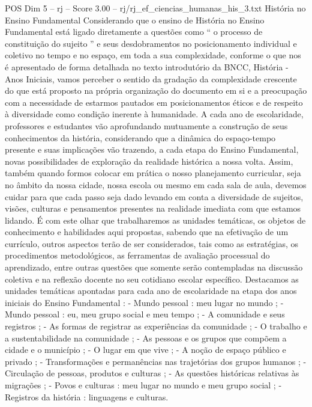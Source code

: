\begin{textsample}{POS Dim 5 – rj – Score 3.00 – rj/rj\_ef\_ciencias\_humanas\_his\_3.txt}  \label{ex:f5_pos_199}
História no Ensino Fundamental Considerando que o ensino de História no Ensino Fundamental está ligado diretamente a questões como “ o processo de constituição do sujeito ” e seus desdobramentos no posicionamento individual e coletivo no tempo e no espaço, em toda a sua complexidade, conforme o que nos é apresentado de forma detalhada no texto introdutório da BNCC, História - Anos Iniciais, vamos perceber o sentido da gradação da complexidade crescente do que está proposto na própria organização do documento em si e a preocupação com a necessidade de estarmos pautados em posicionamentos éticos e de respeito à diversidade como condição inerente à humanidade.
A cada ano de escolaridade, professores e estudantes vão aprofundando mutuamente a construção de seus conhecimentos da história, considerando que a dinâmica do espaço-tempo presente e suas implicações vão trazendo, a cada etapa do Ensino Fundamental, novas possibilidades de exploração da realidade histórica a nossa volta.
Assim, também quando formos colocar em prática o nosso planejamento curricular, seja no âmbito da nossa cidade, nossa escola ou mesmo em cada sala de aula, devemos cuidar para que cada passo seja dado levando em conta a diversidade de sujeitos, visões, culturas e pensamentos presentes na realidade imediata com que estamos lidando.
É com este olhar que trabalharemos as unidades temáticas, os objetos de conhecimento e habilidades aqui propostas, sabendo que na efetivação de um currículo, outros aspectos terão de ser considerados, tais como as estratégias, os procedimentos metodológicos, as ferramentas de avaliação processual do aprendizado, entre outras questões que somente serão contempladas na discussão coletiva e na reflexão docente no seu cotidiano escolar específico.
Destacamos as unidades temáticas apontadas para cada ano de escolaridade na etapa dos anos iniciais do Ensino Fundamental : - Mundo pessoal : meu lugar no mundo ; - Mundo pessoal : eu, meu grupo social e meu tempo ; - A comunidade e seus registros ; - As formas de registrar as experiências da comunidade ; - O trabalho e a sustentabilidade na comunidade ; - As pessoas e os grupos que compõem a cidade e o município ; - O lugar em que vive ; - A noção de espaço público e privado ; - Transformações e permanências nas trajetórias dos grupos humanos ; - Circulação de pessoas, produtos e culturas ; - As questões históricas relativas às migrações ; - Povos e culturas : meu lugar no mundo e meu grupo social ; - Registros da história : linguagens e culturas.

\end{textsample}
